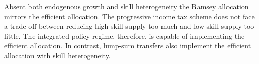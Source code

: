 Absent both endogenous growth and skill heterogeneity the Ramsey allocation mirrors the efficient allocation.  The progressive income tax scheme does not face a trade-off between reducing high-skill supply too much and low-skill supply too little. The integrated-policy regime, therefore, is capable of implementing the efficient allocation. In contrast, lump-sum transfers also implement the efficient allocation with skill heterogeneity.  
